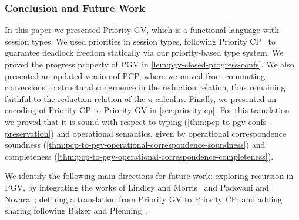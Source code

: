 \documentclass[main.tex]{subfiles}
\begin{document}
\subsubsection*{Conclusion and Future Work}
In this paper we presented Priority GV, which is a functional language with session types. We used priorities in session types, following Priority CP~\cite{dardhagay18} to guarantee deadlock freedom statically via our priority-based type system. We proved the progress property of PGV in \cref{lem:pgv-closed-progress-confs}. We also presented an updated version of PCP, where we moved from commuting conversions to structural congruence in the reduction relation, thus remaining faithful to the reduction relation of the $\pi$-calculus. Finally, we presented an encoding of Priority CP to Priority GV in \cref{sec:priority-cp}. For this translation we proved that it is sound with respect to typing (\cref{thm:pcp-to-pgv-confs-preservation}) and operational semantics, given by operational correspondence soundness (\cref{thm:pcp-to-pgv-operational-correspondence-soundness}) and completeness (\cref{thm:pcp-to-pgv-operational-correspondence-completeness}).

We identify the following main directions for future work: exploring recursion in PGV, by integrating the works of Lindley and Morris~\cite{lindleymorris16} and Padovani and Novara~\cite{padovaninovara15}; defining a translation from Priority GV to Priority CP; and adding sharing following Balzer and Pfenning~\cite{balzerpfenning17}.
\end{document}

